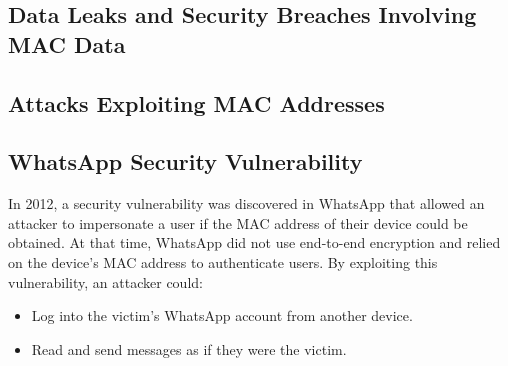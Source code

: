 \documentclass{article}
\begin{document}
  \subsection{\label{subsec:DataLeaks}Data Leaks and Security Breaches Involving MAC Data}
  \subsection{\label{subsec: Attacks}Attacks Exploiting MAC Addresses}
  \subsection{\label{subsec:WhatsApp}WhatsApp Security Vulnerability}





In 2012, a security vulnerability was discovered in WhatsApp that allowed an attacker 
to impersonate a user if the MAC address of their device could be obtained. At that time,
WhatsApp did not use end-to-end encryption and relied on the device's MAC address to authenticate users.
By exploiting this vulnerability, an attacker could:
    \begin{itemize}
    \item Log into the victim's WhatsApp account from another device.
    \item Read and send messages as if they were the victim.
    \end{itemize}
\end{document}
